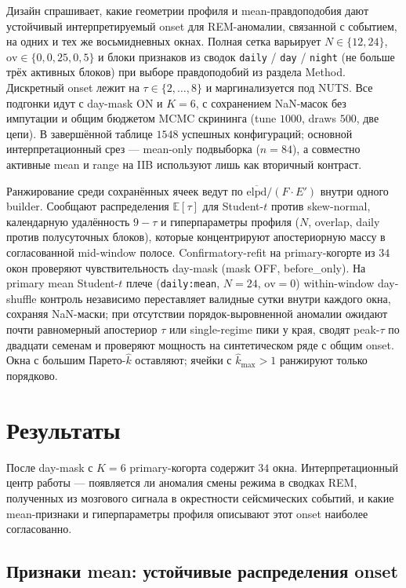 Дизайн спрашивает, какие геометрии профиля и mean-правдоподобия дают устойчивый интерпретируемый onset для REM-аномалии, связанной с событием, на одних и тех же восьмидневных окнах. Полная сетка варьирует \(N\in\{12,24\}\), \(\mathrm{ov}\in\{0,0{,}25,0{,}5\}\) и блоки признаков из сводок \texttt{daily} / \texttt{day} / \texttt{night} (не больше трёх активных блоков) при выборе правдоподобий из раздела Method. Дискретный onset лежит на \(\tau\in\{2,\ldots,8\}\) и маргинализуется под NUTS. Все подгонки идут с day-mask ON и \(K=6\), с сохранением NaN-масок без импутации и общим бюджетом MCMC скрининга (tune \(1000\), draws \(500\), две цепи). В завершённой таблице \(1548\) успешных конфигураций; основной интерпретационный срез — mean-only подвыборка (\(n=84\)), а совместно активные mean и range на IIB используют лишь как вторичный контраст.

Ранжирование среди сохранённых ячеек ведут по \(\overline{\mathrm{elpd}}/(F\cdot E')\) внутри одного builder. Сообщают распределения \(\mathbb{E}[\tau]\) для Student-\(t\) против skew-normal, календарную удалённость \(9-\tau\) и гиперпараметры профиля (\(N\), overlap, daily против полусуточных блоков), которые концентрируют апостериорную массу в согласованной mid-window полосе. Confirmatory-refit на primary-когорте из \(34\) окон проверяют чувствительность day-mask (mask OFF, before\_only). На primary mean Student-\(t\) плече (\texttt{daily:mean}, \(N=24\), \(\mathrm{ov}=0\)) within-window day-shuffle контроль независимо переставляет валидные сутки внутри каждого окна, сохраняя NaN-маски; при отсутствии порядок-выровненной аномалии ожидают почти равномерный апостериор \(\tau\) или single-regime пики у края, сводят peak-\(\tau\) по двадцати семенам и проверяют мощность на синтетическом ряде с общим onset. Окна с большим Парето-\(\hat k\) оставляют; ячейки с \(\hat k_{\max}>1\) ранжируют только порядково.

\section{Результаты}

После day-mask с \(K=6\) primary-когорта содержит \(34\) окна. Интерпретационный центр работы — появляется ли аномалия смены режима в сводках REM, полученных из мозгового сигнала в окрестности сейсмических событий, и какие mean-признаки и гиперпараметры профиля описывают этот onset наиболее согласованно.

\subsection{Признаки mean: устойчивые распределения onset}

